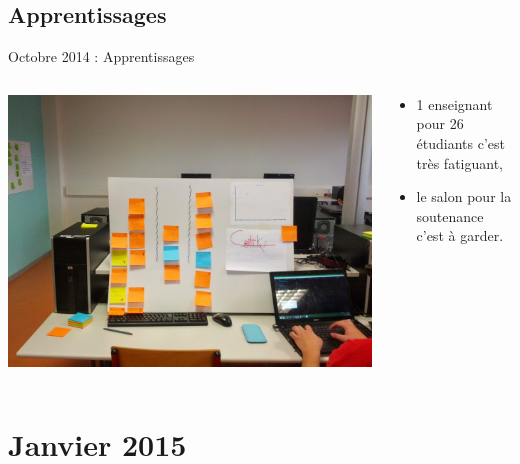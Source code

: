 \documentclass{beamer}
\begin{document}
\subsection{Apprentissages}
\begin{frame}{Octobre 2014 : Apprentissages}
  \begin{columns}
    \begin{column}{0.5\textwidth}
      \begin{center}
        \includegraphics[width=\textwidth]{includes/201410_dashboard.jpg}      
      \end{center}
    \end{column}
    \begin{column}{0.5\textwidth}
      \begin{itemize}
        \item 1 enseignant pour 26 étudiants c'est très fatiguant,
        \item le salon pour la soutenance c'est à garder.
      \end{itemize}
    \end{column}
  \end{columns}
\end{frame}

\section{Janvier 2015}
\end{document}
